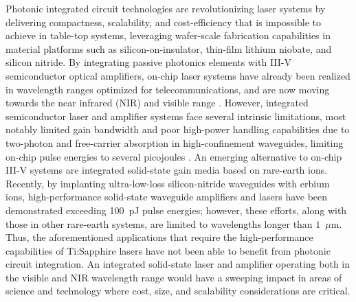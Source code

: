 \documentclass[amsmath, amsthm, amssymb, aps, prb, superscriptaddress, twocolumn, nofootinbib, 10pt]{revtex4-1}%
\begin{document}
Photonic integrated circuit technologies are revolutionizing laser systems by delivering compactness, scalability, and cost-efficiency that is impossible to achieve in table-top systems, leveraging wafer-scale fabrication capabilities in material platforms such as silicon-on-insulator\cite{rizzo2023massively}, thin-film lithium niobate\cite{boes2023lithium}, and silicon nitride\cite{riemensberger2022photonic}. By integrating passive photonics elements with III-V semiconductor optical amplifiers, on-chip laser systems have already been realized in wavelength ranges optimized for telecommunications\cite{xiang2021laser, xiang20233d, zhou2023prospects}, and are now moving towards the near infrared (NIR) and visible range \cite{tran2022extending, corato2023widely, zhang2023photonic}. However, integrated semiconductor laser and amplifier systems face several intrinsic limitations, most notably limited gain bandwidth and poor high-power handling capabilities due to two-photon\cite{ahmad2008energy} and free-carrier absorption in high-confinement waveguides, limiting on-chip pulse energies to several picojoules \cite{chang2022integrated}. An emerging alternative to on-chip III-V systems are integrated solid-state gain media based on rare-earth ions. Recently, by implanting ultra-low-loss silicon-nitride waveguides with erbium ions, high-performance solid-state waveguide amplifiers and lasers have been demonstrated\cite{liu2022photonic,liu2023fully} exceeding 100~pJ pulse energies; however, these efforts, along with those in other rare-earth systems, are limited to wavelengths longer than $1$~$\mu$m. Thus, the aforementioned applications that require the high-performance capabilities of Ti:Sapphire lasers have not been able to benefit from photonic circuit integration. An integrated solid-state laser and amplifier operating both in the visible and NIR wavelength range would have a sweeping impact in areas of science and technology where cost, size, and scalability considerations are critical.
\end{document}
